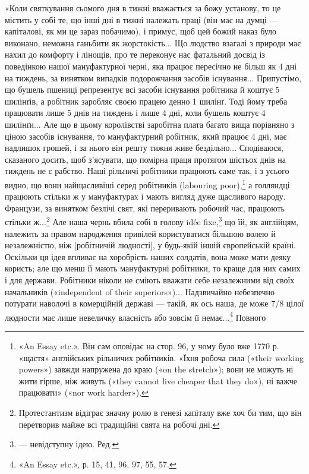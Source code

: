 «Коли святкування сьомого дня в тижні вважається за божу
установу, то це містить у собі те, що інші дні в тижні належать
праці (він має на думці — капіталові, як ми це зараз побачимо),
і примус, щоб цей божий наказ було виконано, неможна ганьбити
як жорстокість... Що людство взагалі з природи має нахил до
комфорту і лінощів, про те переконує нас фатальний досвід із
поведінкою нашої мануфактурної черні, яка працює пересічно
не більш як 4 дні на тиждень, за винятком випадків подорожчання
засобів існування... Припустімо, що бушель пшениці репрезентує
всі засоби існування робітника й коштує 5 шилінґів, а робітник
заробляє своєю працею денно 1 шилінґ. Тоді йому треба працювати
лише 5 днів на тиждень і лише 4 дні, коли бушель коштує
4 шилінґи... Але що в цьому королівстві заробітна плата багато
вища порівняно з ціною засобів існування, то мануфактурний
робітник, який працює 4 дні, має надлишок грошей, і за нього
він решту тижня живе бездільно... Сподіваюся, сказаного досить,
щоб з’ясувати, що помірна праця протягом шістьох днів на тиждень
не є рабство. Наші рільничі робітники працюють саме так,
і з усього видно, що вони найщасливіші серед робітників (labouring
poor),\footnote{
«An Essay etc.». Він сам оповідає на стор. 96, у чому було вже
1770 р. «щастя» англійських рільничих робітників. «Їхня робоча сила
(«their working powers») завжди напружена до краю («on the stretch»);
вони не можуть ні жити гірше, ніж живуть («they cannot live cheaper
that they do»), ні важче працювати» («nor work harder»).
} а голляндці працюють стільки ж у мануфактурах і мають
вигляд дуже щасливого народу. Французи, за винятком безлічі
свят, які переривають робочий час, працюють стільки ж...\footnote{
Протестантизм відіграє значну ролю в генезі капіталу вже хоч
би тим, що він перетворив майже всі традиційні свята на робочі дні.
}
Але наша чернь вбила собі в голову idée fixe,\footnote*{
— невідступну ідею. Ред.
} що їй, як англійцям,
належить за правом народження привілей користуватися більшою
волею й незалежністю, ніж [робітничій людності], у будь-якій
іншій європейській країні. Оскільки ця ідея впливає на
хоробрість наших солдатів, вона може мати деяку користь; але
що менш її мають мануфактурні робітники, то краще для них
самих і для держави. Робітники ніколи не сміють вважати себе
незалежними від своїх начальників («independent of their superiors»)...
Надзвичайно небезпечно потурати наволочі в комерційній
державі — такій, як ось наша, де може 7/8 цілої людности
має лише невеличку власність або зовсім її немає...\footnote{
«An Essay etc.», р. 15, 41, 96, 97, 55, 57.
} Повного
